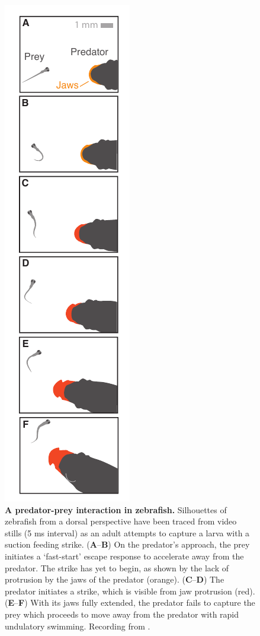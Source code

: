 \documentclass[12pt]{article}
\begin{document}
\pagebreak
\begin{figure}	
\includegraphics[width=.35\textwidth]{Fig_01.pdf}
\centering	
\caption{\textbf{A predator-prey interaction in zebrafish.} Silhouettes of
zebrafish from a dorsal perspective have been traced from video stills (5 ms
interval) as an adult attempts to capture a larva with a suction feeding
strike.  (\textbf{A}--\textbf{B}) On the predator's approach, the prey
initiates a `fast-start' escape response to accelerate away from the predator.
The strike has yet to begin, as shown by the lack of protrusion by the jaws of
the predator (orange). (\textbf{C}--\textbf{D}) The predator initiates a
strike, which is visible from jaw protrusion (red). (\textbf{E}--\textbf{F}) 
With its jaws fully extended, the predator fails to capture the prey which
proceeds to move away from the predator with rapid undulatory swimming.
Recording from \cite{Stewart:2014cm}.}
\label{pred_prey}
\end{figure}
\end{document}
